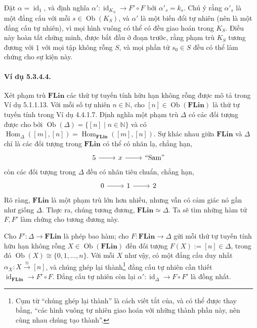 Đặt $\alpha=\operatorname{id}_{\underline{1}}$, và định nghĩa $\alpha':\operatorname{id}_{K_S}\to F'\circ F$ bởi $\alpha'_s=k_s$. Chú ý rằng $\alpha'_s$ là một đẳng cấu với mỗi $s\in\operatorname{Ob}(K_S)$, và $\alpha'$ là một biến đổi tự nhiên (nên là một đẳng cấu tự nhiên), vì mọi hình vuông có thể có đều giao hoán trong $K_S$. Điều này hoàn tất chứng minh, được bắt đầu ở đoạn trước, rằng phạm trù $K_S$ tương đương với $\underline{1}$ với mọi tập không rỗng $S$, và mọi phần tử $s_0\in S$ đều có thể làm chứng cho sự kiện này.
\paragraph{Ví dụ 5.3.4.4.} Xét phạm trù $\mathbf{FLin}$ các thứ tự tuyến tính hữu hạn không rỗng được mô tả trong Ví dụ 5.1.1.13. Với mỗi số tự nhiên $n\in\mathbb N$, cho $[n]\in\operatorname{Ob}(\mathbf{FLin})$ là thứ tự tuyến tính trong Ví dụ 4.4.1.7. Định nghĩa một phạm trù $\Delta$ có các đối tượng được cho bởi
$\operatorname{Ob}(\Delta)=\{[n]\mid n\in\mathbb N\}$ và có $\operatorname{Hom}_{\Delta}([m],[n])=\operatorname{Hom}_{\mathbf{FLin}}([m],[n])$. Sự khác nhau giữa $\mathbf{FLin}$ và $\Delta$ chỉ là các đối tượng trong $\mathbf{FLin}$ có thể có nhãn lạ, chẳng hạn,
\[\begin{tikzcd}5\arrow[r]&x\arrow[r]&\text{``Sam''}\end{tikzcd}\]
còn các đối tượng trong $\Delta$ đều có nhãn tiêu chuẩn, chẳng hạn,
\[\begin{tikzcd}0\arrow[r]&1\arrow[r]&2\end{tikzcd}\]
Rõ ràng, $\mathbf{FLin}$ là một phạm trù lớn hơn nhiều, nhưng vẫn có cảm giác nó gần như giống $\Delta$. Thực ra, chúng tương đương, $\mathbf{FLin}\simeq\Delta$. Ta sẽ tìm những hàm tử $F,F'$ làm chứng cho tương đương này.

Cho $F':\Delta\to\mathbf{FLin}$ là phép bao hàm; cho $F:\mathbf{FLin}\to\Delta$ gửi mỗi thứ tự tuyến tính hữu hạn không rỗng $X\in\operatorname{Ob}(\mathbf{FLin})$ đến đối tượng $F(X):=[n]\in\Delta$, trong đó $\operatorname{Ob}(X)\cong\{0,1,\ldots,n\}$. Với mỗi $X$ như vậy, có một đẳng cấu duy nhất $\alpha_X:X\xrightarrow{\cong}[n]$, và chúng ghép lại thành\footnote{Cụm từ ``chúng ghép lại thành'' là cách viết tắt của, và có thể được thay bằng, ``các hình vuông tự nhiên giao hoán với những thành phần này, nên cùng nhau chúng tạo thành''.} đẳng cấu tự nhiên cần thiết $\operatorname{id}_{\mathbf{FLin}}\to F'\circ F$. Đẳng cấu tự nhiên còn lại $\alpha':\operatorname{id}_{\Delta}\to F\circ F'$ là đồng nhất.
